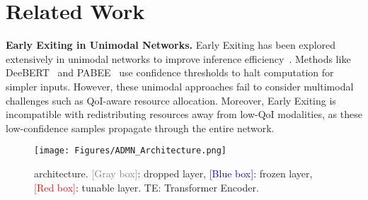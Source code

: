 \section{Related Work}







\textbf{Early Exiting in Unimodal Networks.}
Early Exiting has been explored extensively in unimodal networks to improve inference efficiency~\cite{xin2020deebert, neurips2020_d4dd111a, meng2022adavit}. Methods like DeeBERT~\cite{xin2020deebert} and PABEE~\cite{neurips2020_d4dd111a} use confidence thresholds to halt computation for simpler inputs. However, these unimodal approaches fail to consider multimodal challenges such as QoI-aware resource allocation. Moreover, Early Exiting is incompatible with redistributing resources away from low-QoI modalities, as these low-confidence samples propagate through the entire network.



\begin{figure*}
    \centering
    \texttt{[image: Figures/ADMN\_Architecture.png]}
    \vspace{-0.2in}
\caption{\name architecture. \textcolor{gray}{[Gray box]}: dropped layer, \textcolor{blue}{[Blue box]}: frozen layer, \textcolor{red}{[Red box]}: tunable layer. TE: Transformer Encoder.}
    \label{fig:admn_architecture}
    \vspace{-0.1in}
\end{figure*}

